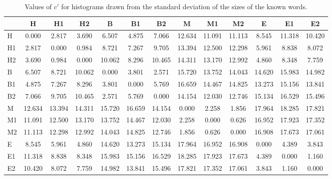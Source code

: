 \begin{table*}[h!]
\begin{center}
\begin{tabular}{| l | c | c | c | c | c | c | c | c | c | c | c | c |}\hline
 & H & H1 & H2 & B & B1 & B2 & M & M1 & M2 & E & E1 & E2 \\\hline
H & 0.000  & 2.817  & 3.690  & 6.507  & 4.875  & 7.066  & 12.634  & 11.091  & 11.113  & 8.545  & 11.318  & 10.420 \\\hline
H1 & 2.817  & 0.000  & 0.984  & 8.721  & 7.267  & 9.705  & 13.394  & 12.500  & 12.298  & 5.961  & 8.838  & 8.072 \\\hline
H2 & 3.690  & 0.984  & 0.000  & 10.062  & 8.296  & 10.465  & 14.311  & 13.170  & 12.992  & 4.860  & 8.348  & 7.759 \\\hline
B & 6.507  & 8.721  & 10.062  & 0.000  & 3.801  & 2.571  & 15.720  & 13.752  & 14.043  & 14.620  & 15.983  & 14.982 \\\hline
B1 & 4.875  & 7.267  & 8.296  & 3.801  & 0.000  & 5.769  & 16.659  & 14.467  & 14.825  & 13.273  & 15.156  & 13.841 \\\hline
B2 & 7.066  & 9.705  & 10.465  & 2.571  & 5.769  & 0.000  & 14.154  & 12.030  & 12.746  & 15.134  & 16.529  & 15.496 \\\hline
M & 12.634  & 13.394  & 14.311  & 15.720  & 16.659  & 14.154  & 0.000  & 2.258  & 1.856  & 17.964  & 18.285  & 17.821 \\\hline
M1 & 11.091  & 12.500  & 13.170  & 13.752  & 14.467  & 12.030  & 2.258  & 0.000  & 0.626  & 16.952  & 17.923  & 17.352 \\\hline
M2 & 11.113  & 12.298  & 12.992  & 14.043  & 14.825  & 12.746  & 1.856  & 0.626  & 0.000  & 16.908  & 17.673  & 17.061 \\\hline
E & 8.545  & 5.961  & 4.860  & 14.620  & 13.273  & 15.134  & 17.964  & 16.952  & 16.908  & 0.000  & 4.389  & 3.843 \\\hline
E1 & 11.318  & 8.838  & 8.348  & 15.983  & 15.156  & 16.529  & 18.285  & 17.923  & 17.673  & 4.389  & 0.000  & 1.160 \\\hline
E2 & 10.420  & 8.072  & 7.759  & 14.982  & 13.841  & 15.496  & 17.821  & 17.352  & 17.061  & 3.843  & 1.160  & 0.000 \\\hline
\end{tabular}
\caption{Values of $c'$ for histograms drawn from the standard deviation of the sizes of the known words.}
\end{center}
\end{table*}